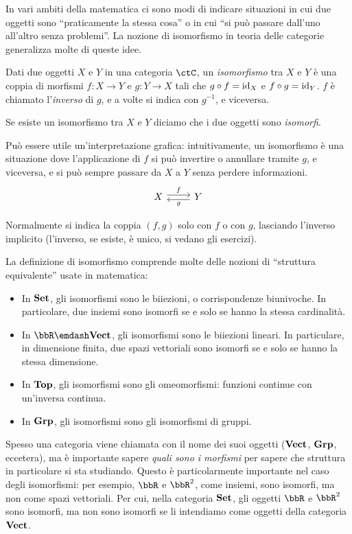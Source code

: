 In vari ambiti della matematica ci sono modi di indicare situazioni in cui due oggetti sono ``praticamente la stessa cosa'' o in cui ``si può passare dall'uno all'altro senza problemi''. La nozione di isomorfismo in teoria delle categorie generalizza molte di queste idee.

\begin{definition}
 Dati due oggetti $X$ e $Y$ in una categoria $\ctC$, un \emph{isomorfismo} tra $X$ e $Y$ è una coppia di morfismi $f:X\to Y$ e $g:Y\to X$ tali che $g\circ f=\mathrm{id}_X$ e $f\circ g=\mathrm{id}_Y$.
 $f$ è chiamato l'\emph{inverso} di $g$, e a volte si indica con $g^{-1}$, e viceversa.

 Se esiste un isomorfismo tra $X$ e $Y$ diciamo che i due oggetti sono \emph{isomorfi}.
\end{definition}

Può essere utile un'interpretazione grafica: intuitivamente, un isomorfismo è una situazione dove l'applicazione di $f$ si può invertire o annullare tramite $g$, e viceversa, e si può sempre passare da $X$ a $Y$ senza perdere informazioni.
\[
\begin{tikzcd}
 X \ar[shift left]{r}{f} & Y \ar[shift left]{l}{g}
\end{tikzcd}
\]

Normalmente si indica la coppia $(f,g)$ solo con $f$ o con $g$, lasciando l'inverso implicito (l'inverso, se esiste, è unico, si vedano gli esercizi).

\begin{examples}
 La definizione di isomorfismo comprende molte delle nozioni di ``struttura equivalente'' usate in matematica:
 \begin{itemize}
  \item In $\mathbf{Set}$, gli isomorfismi sono le biiezioni, o corrispondenze biunivoche. In particolare, due insiemi sono isomorfi se e solo se hanno la stessa cardinalità.
  \item In $\bbR\emdash\ctVect$, gli isomorfismi sono le biiezioni lineari. In particulare, in dimensione finita, due spazi vettoriali sono isomorfi se e solo se hanno la stessa dimensione.
  \item In $\mathbf{Top}$, gli isomorfismi sono gli omeomorfismi: funzioni continue con un'inversa continua.
  \item In $\mathbf{Grp}$, gli isomorfismi sono gli isomorfismi di gruppi.
 \end{itemize}
\end{examples}

\begin{warning}
 Spesso una categoria viene chiamata con il nome dei suoi oggetti ($\mathbf{Vect}$, $\mathbf{Grp}$, eccetera), ma è importante sapere \emph{quali sono i morfismi} per sapere che struttura in particolare si sta studiando. Questo è particolarmente importante nel caso degli isomorfismi: per esempio, $\bbR$ e $\bbR^2$, come insiemi, sono isomorfi, ma non come spazi vettoriali. Per cui, nella categoria $\mathbf{Set}$, gli oggetti $\bbR$ e $\bbR^2$ sono isomorfi, ma non sono isomorfi se li intendiamo come oggetti della categoria $\mathbf{Vect}$.
\end{warning}

